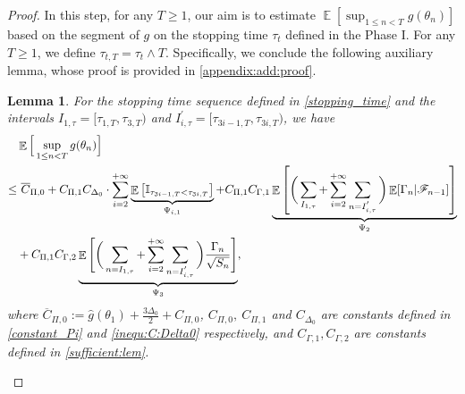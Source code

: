 \documentclass[standalone]{article}
\newcommand{\I}{\mathbb{I}}
\newtheorem{lem}{Lemma}[section]
\DeclareMathOperator{\Expect}{\mathbb{E}}
\begin{document}
\begin{proof}
 In this step, for any $T \geq 1$, our aim is to estimate $\Expect[\sup_{1\le n<T}g(\theta_{n})]$ based on the segment of $g$ on the stopping time $\tau_t$ defined in the Phase I. For any $T \geq 1$, we define $\tau_{t,T} = \tau_t \wedge T$.
Specifically, we conclude the following auxiliary lemma, whose proof is provided in \cref{appendix:add:proof}.
\begin{lem}\label{lem:estimation:supg}
For the stopping time sequence defined in  \cref{stopping_time} and the intervals $I_{1,\tau}=[\tau_{1,T}, \tau_{3,T})$ and   $I_{i,\tau}^{'}=[\tau_{3i-1,T}, \tau_{3i,T})$, we have %
\begin{align}\label{lem:inequ:supg:main}
& \Expect\Big[\sup_{1\le n< T}g(\theta_{n})\Big] \notag \\
\le&\ \overline{C}_{\Pi,0}+ C_{\Pi,1}C_{\Delta_{0}}\cdot\sum_{i=2}^{+\infty}\underbrace{\Expect\big[\I_{\tau_{3i-1,T}<\tau_{3i,T}}\big]}_{\Psi_{i,1}}+C_{\Pi,1}C_{\Gamma,1}\underbrace{\Expect\left[\bigg(\sum_{I_{1,\tau}}+\sum_{i=2}^{+\infty}\sum_{n=I_{i,\tau}^{'}} \bigg)\Expect[\Gamma_n|\mathscr{F}_{n-1}]\right]}_{\Psi_{2}} \notag \\&+C_{\Pi,1}C_{\Gamma,2}\underbrace{\Expect\Bigg[\bigg(\sum_{n=I_{1,\tau}}+\sum_{i=2}^{+\infty}\sum_{n=I_{i,\tau}^{'}} \bigg)\frac{\Gamma_{n}}{\sqrt{S_{n}}}\Bigg]}_{\Psi_{3}},
\end{align}
where $\overline{C}_{\Pi,0}:=\hat{g}(\theta_{1})+\frac{3\Delta_{0}}{2}+C_{\Pi,0}$,  $C_{\Pi,0},\ C_{\Pi,1}$ and $C_{\Delta_{0}}$ are constants defined in \cref{constant_Pi} and \cref{inequ:C:Delta0} respectively, and $C_{\Gamma,1}, C_{\Gamma,2}$ are constants defined in \cref{sufficient:lem}. 
\end{lem}


\end{proof}
\end{document}

